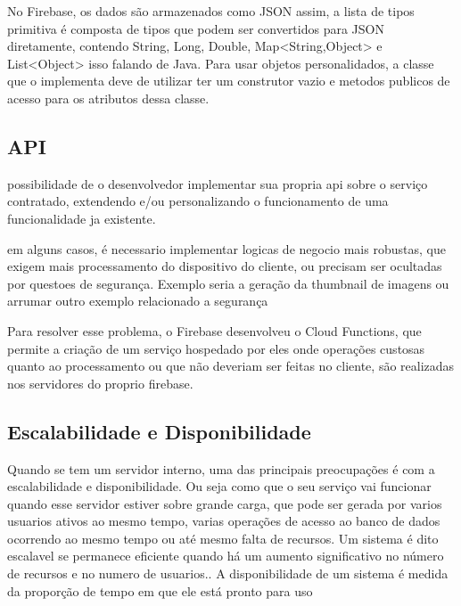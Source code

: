  	No Firebase, os dados são armazenados como JSON assim, a lista de tipos primitiva é composta de tipos que podem ser convertidos para JSON diretamente, contendo String, Long, Double, Map<String,Object> e List<Object> isso falando de Java. Para usar objetos personalidados, a classe que o implementa deve de utilizar ter um construtor vazio e metodos publicos de acesso para os atributos dessa classe. \cite{https://firebase.google.com/docs/database/android/read-and-write}

	\subsection{API}
	\label{sub:api}
	possibilidade de o desenvolvedor implementar sua propria api sobre o serviço contratado, extendendo e/ou personalizando o funcionamento de uma funcionalidade ja existente.

	em alguns casos, é necessario implementar logicas de negocio mais robustas, que exigem mais processamento do dispositivo do cliente, ou precisam ser ocultadas por questoes de segurança. Exemplo seria a geração da thumbnail de imagens ou {arrumar outro exemplo relacionado a segurança}


	Para resolver esse problema, o Firebase desenvolveu o Cloud Functions, que permite a criação de um serviço hospedado por eles onde operações custosas quanto ao processamento ou que não deveriam ser feitas no cliente, são realizadas nos servidores do proprio firebase.


	\subsection{Escalabilidade e Disponibilidade}
	\label{subsec:scalability_and_availability}
	Quando se tem um servidor interno, uma das principais preocupações é com a escalabilidade e disponibilidade. Ou seja como que o seu serviço vai funcionar quando esse servidor estiver sobre grande carga, que pode ser gerada por varios usuarios ativos ao mesmo tempo, varias operações de acesso ao banco de dados ocorrendo ao mesmo tempo ou até mesmo falta de recursos. Um sistema é dito escalavel se permanece eficiente quando há um aumento significativo no número de recursos e no numero de usuarios.\cite {colouris: p31 escalabilidade}. A disponibilidade de um sistema é medida da proporção de tempo em que ele está pronto para uso \cite {colouris: p33 tratamento de erro}

